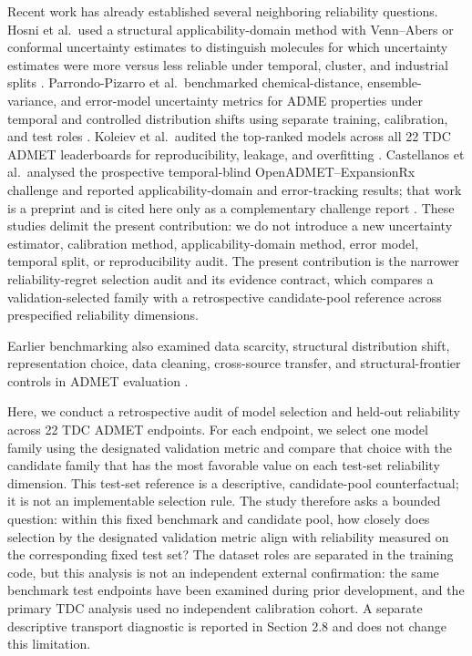 \documentclass[
]{article}
\begin{document}
Recent work has already established several neighboring reliability questions. Hosni et al.~used a structural applicability-domain method with Venn--Abers or conformal uncertainty estimates to distinguish molecules for which uncertainty estimates were more versus less reliable under temporal, cluster, and industrial splits \cite{hosni2026}. Parrondo-Pizarro et al.~benchmarked chemical-distance, ensemble-variance, and error-model uncertainty metrics for ADME properties under temporal and controlled distribution shifts using separate training, calibration, and test roles \cite{parrondo2026}. Koleiev et al.~audited the top-ranked models across all 22 TDC ADMET leaderboards for reproducibility, leakage, and overfitting \cite{koleiev2026}. Castellanos et al.~analysed the prospective temporal-blind OpenADMET--ExpansionRx challenge and reported applicability-domain and error-tracking results; that work is a preprint and is cited here only as a complementary challenge report \cite{castellanos2026}. These studies delimit the present contribution: we do not introduce a new uncertainty estimator, calibration method, applicability-domain method, error model, temporal split, or reproducibility audit. The present contribution is the narrower reliability-regret selection audit and its evidence contract, which compares a validation-selected family with a retrospective candidate-pool reference across prespecified reliability dimensions.

Earlier benchmarking also examined data scarcity, structural distribution
shift, representation choice, data cleaning, cross-source transfer, and
structural-frontier controls in ADMET evaluation \cite{zhao2026reliability,kamuntavicius2025benchmarking,zheng2026frontier}.

Here, we conduct a retrospective audit of model selection and held-out
reliability across 22 TDC ADMET endpoints. For each endpoint, we select
one model family using the designated validation metric and compare that
choice with the candidate family that has the most favorable value on
each test-set reliability dimension. This test-set reference is a
descriptive, candidate-pool counterfactual; it is not an implementable
selection rule. The study therefore asks a bounded question: within this
fixed benchmark and candidate pool, how closely does selection by the
designated validation metric align with reliability measured on the
corresponding fixed test set? The dataset roles are separated in the
training code, but this analysis is not an independent external
confirmation: the same benchmark test endpoints have been examined
during prior development, and the primary TDC analysis used no
independent calibration cohort. A separate descriptive
transport diagnostic is reported in Section 2.8 and does not change this
limitation.
\end{document}
